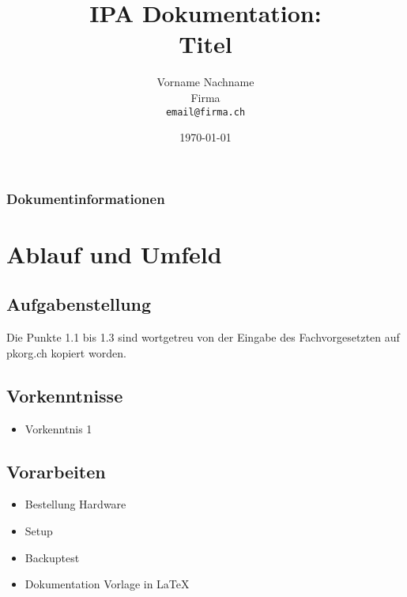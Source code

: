 \documentclass[a4paper,11pt,oneside]{report}
\begin{document}
\author{Vorname Nachname \\ 
    Firma \\ 
    \texttt{email@firma.ch} }
\date{\today}
\title{IPA Dokumentation: \\
    Titel }
\maketitle
\section{Dokumentinformationen}
\nopagebreak


\tableofcontents
\listoffigures
\listoftables

\renewcommand{\abstractname}{Management Summary}
\begin{abstract}
\thispagestyle{plain}

\end{abstract}
\part{Ablauf und Umfeld}


\chapter{Aufgabenstellung}
Die Punkte 1.1 bis 1.3 sind wortgetreu von der Eingabe des Fachvorgesetzten auf pkorg.ch kopiert worden.


\chapter{Vorkenntnisse}
\begin{itemize}
	\item Vorkenntnis 1
\end{itemize}  
%

\chapter{Vorarbeiten}
\begin{itemize}
	\item Bestellung Hardware
	\item Setup 
	\item Backuptest
	\item Dokumentation Vorlage in \LaTeX{}
\end{itemize}
%
\end{document}
